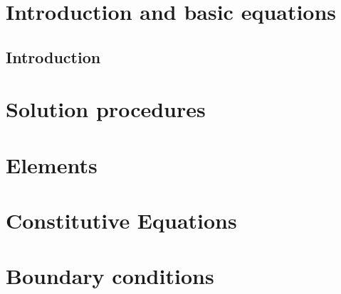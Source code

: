 \documentclass[a4paper]{book}
\begin{document}


\clearpage
\pagestyle{headings}

\tableofcontents
\chapter{Introduction and basic equations}
\section{Introduction}




\chapter{Solution procedures}

\chapter{Elements}
\chapter{Constitutive Equations}

\chapter{Boundary conditions}

{}



\end{document}
